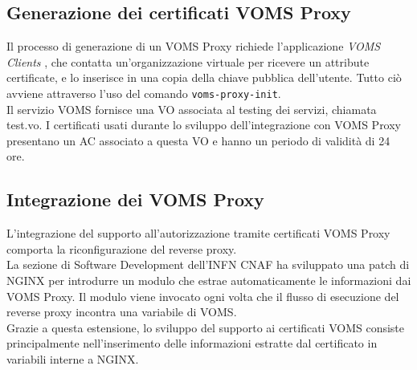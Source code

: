 \subsection{Generazione dei certificati VOMS Proxy}
Il processo di generazione di un VOMS Proxy richiede l'applicazione \textit{VOMS Clients} \cite{VOMS_client}, che contatta un'organizzazione virtuale per ricevere un attribute 
certificate, e lo inserisce in una copia della chiave pubblica dell'utente. Tutto ciò avviene attraverso l'uso del comando \texttt{voms-proxy-init}. 
\\Il servizio VOMS fornisce una VO associata al testing dei servizi, chiamata test.vo. I certificati usati durante lo sviluppo 
dell'integrazione con VOMS Proxy presentano un AC associato a questa VO e hanno un periodo di validità di 24 ore.   

\subsection{Integrazione dei VOMS Proxy}
L'integrazione del supporto all'autorizzazione tramite certificati VOMS Proxy comporta la riconfigurazione del reverse proxy.
\\ La sezione di Software Development dell'INFN CNAF ha sviluppato una patch di NGINX \cite{voms_nginx} per introdurre un modulo che estrae automaticamente le informazioni dai VOMS Proxy.
 Il modulo viene invocato ogni volta che il flusso di esecuzione del reverse proxy incontra una variabile di VOMS.
\\ Grazie a questa estensione, lo sviluppo del supporto ai certificati VOMS consiste principalmente nell'inserimento 
delle informazioni estratte dal certificato in variabili interne a NGINX. 

